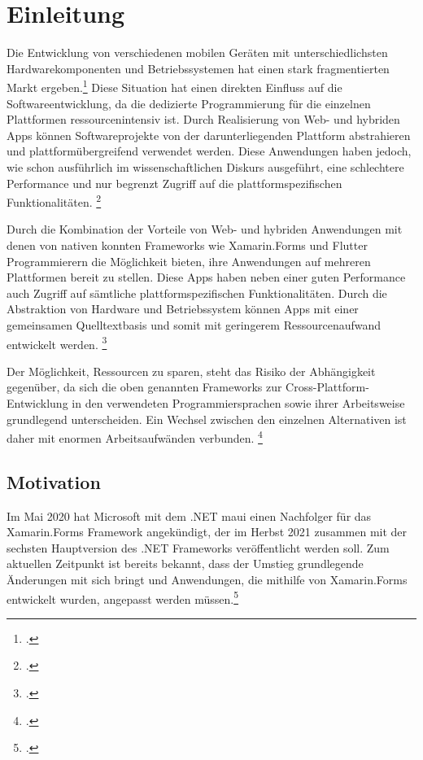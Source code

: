 \chapter{Einleitung}
Die Entwicklung von verschiedenen mobilen Geräten mit unterschiedlichsten Hardwarekomponenten und Betriebssystemen hat einen stark fragmentierten Markt ergeben.\footcite[Vgl.][S. 3]{Joorabchi2016}  Diese Situation hat einen direkten Einfluss auf die Softwareentwicklung, da die dedizierte Programmierung für die einzelnen Plattformen ressourcenintensiv ist.  Durch Realisierung von Web- und hybriden Apps können Softwareprojekte von der darunterliegenden Plattform abstrahieren und plattformübergreifend verwendet werden.  Diese Anwendungen haben jedoch, wie schon ausführlich im wissenschaftlichen Diskurs ausgeführt,  eine schlechtere Performance und nur begrenzt Zugriff auf die plattformspezifischen Funktionalitäten.  \footcite[Vgl.][S. 110ff.]{Barton2016} 

Durch die Kombination der Vorteile von Web- und hybriden Anwendungen mit denen von nativen konnten Frameworks wie Xamarin.Forms und Flutter Programmierern die Möglichkeit bieten,  ihre Anwendungen auf mehreren Plattformen bereit zu stellen.  Diese Apps haben neben einer guten Performance auch Zugriff auf sämtliche plattformspezifischen Funktionalitäten.  Durch die Abstraktion von Hardware und Betriebssystem können Apps mit einer gemeinsamen Quelltextbasis und somit mit geringerem Ressourcenaufwand entwickelt werden. \footcite[Vgl.][S. 295]{Vollmer2017} 

Der Möglichkeit, Ressourcen zu sparen, steht das Risiko der Abhängigkeit gegenüber, da sich die oben genannten Frameworks zur Cross-Plattform-Entwicklung in den verwendeten Programmiersprachen sowie ihrer Arbeitsweise grundlegend unterscheiden.  Ein Wechsel zwischen den einzelnen Alternativen ist daher mit enormen Arbeitsaufwänden verbunden. \footcite[Vgl.][S. 64]{Wissel2017}  

\section{Motivation}
Im Mai 2020 hat Microsoft mit dem .NET \ac{maui} einen Nachfolger für das Xamarin.Forms Framework angekündigt, der im Herbst 2021 zusammen mit der sechsten Hauptversion des .NET Frameworks veröffentlicht werden soll. Zum aktuellen Zeitpunkt ist bereits bekannt, dass der Umstieg grundlegende Änderungen mit sich bringt und Anwendungen,  die mithilfe von Xamarin.Forms entwickelt wurden,  angepasst werden müssen.\footcite[Vgl.][Abgerufen am 28.10.2020]{Hunter2020}

